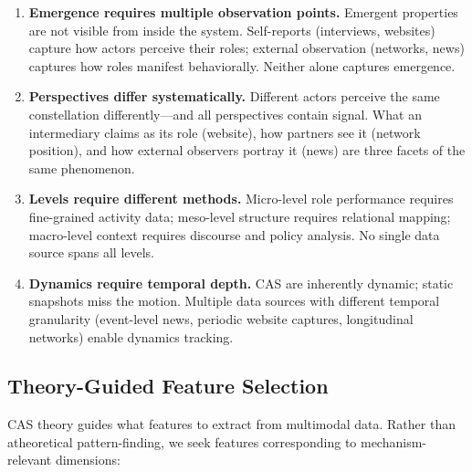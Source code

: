\documentclass[../main.tex]{subfiles}
\begin{document}
\begin{enumerate}[leftmargin=*, itemsep=0.4em]
\item \textbf{Emergence requires multiple observation points.} Emergent properties are not visible from inside the system. Self-reports (interviews, websites) capture how actors perceive their roles; external observation (networks, news) captures how roles manifest behaviorally. Neither alone captures emergence.

\item \textbf{Perspectives differ systematically.} Different actors perceive the same constellation differently---and all perspectives contain signal. What an intermediary claims as its role (website), how partners see it (network position), and how external observers portray it (news) are three facets of the same phenomenon.

\item \textbf{Levels require different methods.} Micro-level role performance requires fine-grained activity data; meso-level structure requires relational mapping; macro-level context requires discourse and policy analysis. No single data source spans all levels.

\item \textbf{Dynamics require temporal depth.} CAS are inherently dynamic; static snapshots miss the motion. Multiple data sources with different temporal granularity (event-level news, periodic website captures, longitudinal networks) enable dynamics tracking.
\end{enumerate}

\subsection{Theory-Guided Feature Selection}

CAS theory guides what features to extract from multimodal data. Rather than atheoretical pattern-finding, we seek features corresponding to mechanism-relevant dimensions:
\end{document}
